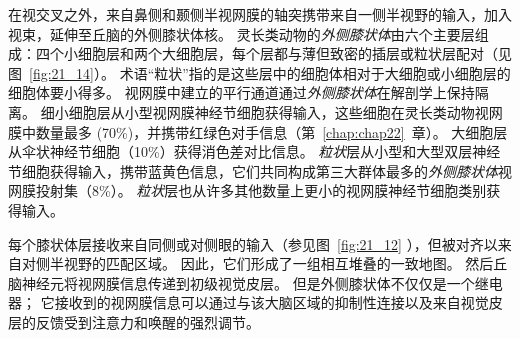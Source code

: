 在视交叉之外，来自鼻侧和颞侧半视网膜的轴突携带来自一侧半视野的输入，加入视束，延伸至丘脑的外侧膝状体核。
灵长类动物的\textit{外侧膝状体}由六个主要层组成：四个小细胞层和两个大细胞层，每个层都与薄但致密的插层或粒状层配对（见图~\ref{fig:21_14}）。
术语“粒状”指的是这些层中的细胞体相对于大细胞或小细胞层的细胞体要小得多。
视网膜中建立的平行通道通过\textit{外侧膝状体}在解剖学上保持隔离。
细小细胞层从小型视网膜神经节细胞获得输入，这些细胞在灵长类动物视网膜中数量最多 (70\%)，并携带红绿色对手信息（第~\ref{chap:chap22}~章）。
大细胞层从伞状神经节细胞（10\%）获得消色差对比信息。
\textit{粒状}层从小型和大型双层神经节细胞获得输入，携带蓝黄色信息，它们共同构成第三大群体最多的\textit{外侧膝状体}视网膜投射集（8\%）。
\textit{粒状}层也从许多其他数量上更小的视网膜神经节细胞类别获得输入。


每个膝状体层接收来自同侧或对侧眼的输入（参见图~\ref{fig:21_12} ），但被对齐以来自对侧半视野的匹配区域。
因此，它们形成了一组相互堆叠的一致地图。
然后丘脑神经元将视网膜信息传递到初级视觉皮层。
但是外侧膝状体不仅仅是一个继电器；
它接收到的视网膜信息可以通过与该大脑区域的抑制性连接以及来自视觉皮层的反馈受到注意力和唤醒的强烈调节。


